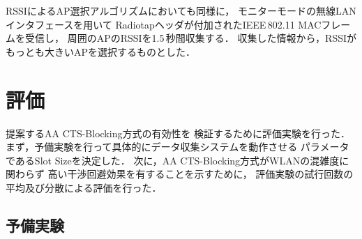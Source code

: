 \documentclass[technicalreport]{ieicej}
\begin{document}
RSSIによるAP選択アルゴリズムにおいても同様に，
モニターモードの無線LANインタフェースを用いて
Radiotapヘッダが付加されたIEEE\,802.11 MACフレームを受信し，
周囲のAPのRSSIを1.5\,秒間収集する．
収集した情報から，RSSIがもっとも大きいAPを選択するものとした．



\section{評価}
\label{sec:eval}

提案するAA CTS-Blocking方式の有効性を
検証するために評価実験を行った．
まず，予備実験を行って具体的にデータ収集システムを動作させる
パラメータであるSlot Sizeを決定した．
次に，AA CTS-Blocking方式がWLANの混雑度に関わらず
高い干渉回避効果を有することを示すために，
評価実験の試行回数の平均及び分散による評価を行った．


\subsection{予備実験}
\label{ssec:before_exp}
\end{document}
